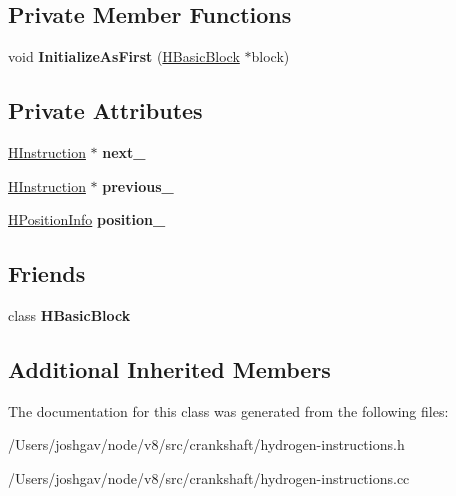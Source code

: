 \subsection*{Private Member Functions}
\begin{DoxyCompactItemize}
\item 
void {\bfseries Initialize\+As\+First} (\hyperlink{classv8_1_1internal_1_1_h_basic_block}{H\+Basic\+Block} $\ast$block)\hypertarget{classv8_1_1internal_1_1_h_instruction_a08b9e228a6e6625187acad1dcde17821}{}\label{classv8_1_1internal_1_1_h_instruction_a08b9e228a6e6625187acad1dcde17821}

\end{DoxyCompactItemize}
\subsection*{Private Attributes}
\begin{DoxyCompactItemize}
\item 
\hyperlink{classv8_1_1internal_1_1_h_instruction}{H\+Instruction} $\ast$ {\bfseries next\+\_\+}\hypertarget{classv8_1_1internal_1_1_h_instruction_a114ee099c361fe11595dba64a118f3ea}{}\label{classv8_1_1internal_1_1_h_instruction_a114ee099c361fe11595dba64a118f3ea}

\item 
\hyperlink{classv8_1_1internal_1_1_h_instruction}{H\+Instruction} $\ast$ {\bfseries previous\+\_\+}\hypertarget{classv8_1_1internal_1_1_h_instruction_af06943545e0ee0ddbe84bb45fce62108}{}\label{classv8_1_1internal_1_1_h_instruction_af06943545e0ee0ddbe84bb45fce62108}

\item 
\hyperlink{classv8_1_1internal_1_1_h_position_info}{H\+Position\+Info} {\bfseries position\+\_\+}\hypertarget{classv8_1_1internal_1_1_h_instruction_a586e984ecd2234e28c59e8bf2376f9d2}{}\label{classv8_1_1internal_1_1_h_instruction_a586e984ecd2234e28c59e8bf2376f9d2}

\end{DoxyCompactItemize}
\subsection*{Friends}
\begin{DoxyCompactItemize}
\item 
class {\bfseries H\+Basic\+Block}\hypertarget{classv8_1_1internal_1_1_h_instruction_a5478374b6d520142cfdd17f9f28605d3}{}\label{classv8_1_1internal_1_1_h_instruction_a5478374b6d520142cfdd17f9f28605d3}

\end{DoxyCompactItemize}
\subsection*{Additional Inherited Members}


The documentation for this class was generated from the following files\+:\begin{DoxyCompactItemize}
\item 
/\+Users/joshgav/node/v8/src/crankshaft/hydrogen-\/instructions.\+h\item 
/\+Users/joshgav/node/v8/src/crankshaft/hydrogen-\/instructions.\+cc\end{DoxyCompactItemize}
